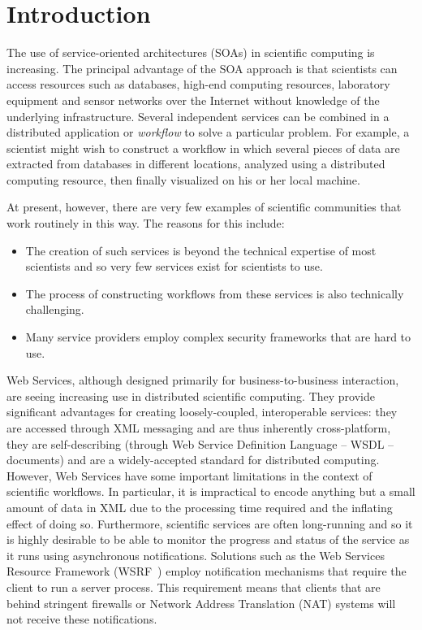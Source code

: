\documentclass[a4paper]{article}
\begin{document}
\section{Introduction}\label{sec:intro}
The use of service-oriented architectures (SOAs) in scientific computing is increasing.  The principal advantage of the SOA approach is that scientists can access resources such as databases, high-end computing resources, laboratory equipment and sensor networks over the Internet without knowledge of the underlying infrastructure.  Several independent services can be combined in a distributed application or \textit{workflow\/} to solve a particular problem.  For example, a scientist might wish to construct a workflow in which several pieces of data are extracted from databases in different locations, analyzed using a distributed computing resource, then finally visualized on his or her local machine.

At present, however, there are very few examples of scientific communities that work routinely in this way.  The reasons for this include:

\begin{itemize}
\item The creation of such services is beyond the technical expertise of most scientists and so very few services exist for scientists to use.
\item The process of constructing workflows from these services is also technically challenging.
\item Many service providers employ complex security frameworks that are hard to use.
\end{itemize}

Web Services, although designed primarily for business-to-business interaction, are seeing increasing use in distributed scientific computing.  They provide significant advantages for creating loosely-coupled, interoperable services: they are accessed through XML messaging and are thus inherently cross-platform, they are self-describing (through Web Service Definition Language -- WSDL -- documents) and are a widely-accepted standard for distributed computing.  However, Web Services have some important limitations in the context of scientific workflows. In particular, it is impractical to encode anything but a small amount of data in XML due to the processing time required and the inflating effect of doing so.  Furthermore, scientific services are often long-running and so it is highly desirable to be able to monitor the progress and status of the service as it runs using asynchronous notifications.  Solutions such as the Web Services Resource Framework (WSRF~\cite{WSRF}) employ notification mechanisms that require the client to run a server process.  This requirement means that clients that are behind stringent firewalls or Network Address Translation (NAT) systems will not receive these notifications.
\end{document}
